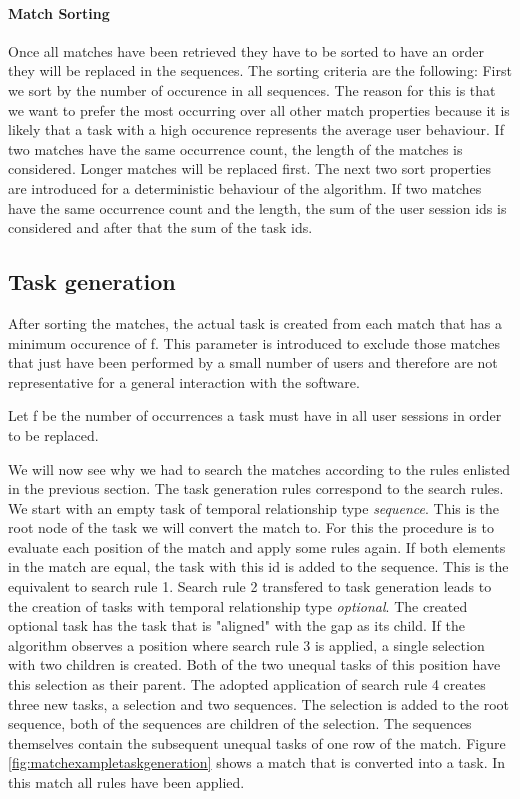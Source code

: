 \paragraph{Match Sorting}
Once all matches have been retrieved they have to be sorted to have an order they will be replaced in the sequences. The sorting criteria are the following: 
First we sort by the number of occurence in all sequences.
The reason for this is that we want to prefer the most occurring over all other match properties because it is likely that a task with a high occurence represents
the average user behaviour. If two matches have the same occurrence count, the length of the matches is considered. Longer matches will be replaced first.
The next two sort properties are introduced for a deterministic behaviour of the algorithm. 
If two matches have the same occurrence count and the length, the sum of the user session ids is considered and after that the sum of the task ids.


\subsection{Task generation}
After sorting the matches, the actual task is created from each match that has a minimum occurence of f. 
This parameter is introduced to exclude those matches that just have been performed by a small number of users and therefore are not representative for a general interaction with the software.
\begin{definition}
	\item Let f be the number of occurrences a task must have in all user sessions in order to be replaced.
		\label{def:minoccurrencecount}
\end{definition}

We will now see why we had to search the matches according to the rules enlisted in the previous section. The task generation rules correspond to the search rules.
We start with an empty task of temporal relationship type \textit{sequence}.
This is the root node of the task we will convert the match to. For this the procedure is to evaluate each position of the match and apply some rules again.
If both elements in the match are equal, the task with this id is added to the sequence. This is the equivalent to search rule 1. 
Search rule 2 transfered to task generation leads to the creation of tasks with temporal relationship type \textit{optional}. 
The created optional task has the task that is "aligned" with the gap as its child.
If the algorithm observes a position where search rule 3 is applied, a single selection with two children is created. 
Both of the two unequal tasks of this position have this selection as their parent.
The adopted application of search rule 4 creates three new tasks, a selection and two sequences. 
The selection is added to the root sequence, both of the sequences are children of the selection.
The sequences themselves contain the subsequent unequal tasks of one row of the match. 
Figure \ref{fig:matchexampletaskgeneration} shows a match that is converted into a task. In this match all rules have been applied.

